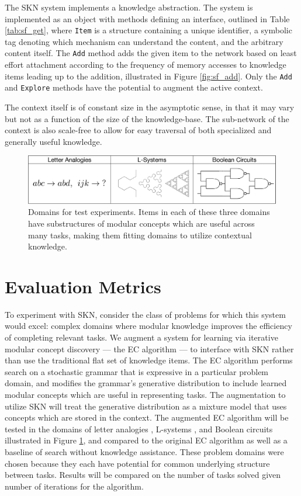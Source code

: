 \documentclass[11pt,letterpaper]{article}
\begin{document}
The SKN system implements a knowledge abstraction. The system is implemented
as an object with methods defining an interface, outlined in Table
\ref{tab:sf_get}, where {\tt Item} is a structure containing a unique
identifier, a symbolic tag denoting which mechanism can understand the
content, and the arbitrary content itself. The {\tt Add} method adds the given
item to the network based on least effort attachment according to the
frequency of memory accesses to knowledge items leading up to the addition,
illustrated in Figure \ref{fig:sf_add}. Only the {\tt Add} and {\tt Explore}
methods have the potential to augment the active context.

The context itself is of constant size in the asymptotic sense, in that it
may vary but not as a function of the size of the knowledge-base. The
sub-network of the context is also scale-free to allow for easy traversal of
both specialized and generally useful knowledge.


\begin{figure}[h]
\centering
\includegraphics[scale=.5]{exps.eps}
\caption{Domains for test experiments. Items in each of these three domains
  have substructures of modular concepts which are useful across many tasks,
  making them fitting domains to utilize contextual knowledge.}
\label{fig:exps}
\end{figure}

\section{Evaluation Metrics}

To experiment with SKN, consider the class of problems for which this system
would excel: complex domains where modular knowledge improves the efficiency
of completing relevant tasks. We augment a system for learning via iterative
modular concept discovery --- the EC algorithm \cite{dechter13} --- to
interface with SKN rather than use the traditional flat set of knowledge
items. The EC algorithm performs search on a stochastic grammar that is
expressive in a particular problem domain, and modifies the grammar's
generative distribution to include learned modular concepts which are useful
in representing tasks. The augmentation to utilize SKN will treat the
generative distribution as a mixture model that uses concepts which are
stored in the context. The augmented EC algorithm will be tested in the
domains of letter analogies \cite{hofstadter94}, L-systems
\cite{rozenberg80}, and Boolean circuits illustrated in Figure
\ref{fig:exps}, and compared to the original EC algorithm as well as a
baseline of search without knowledge assistance. These problem domains were
chosen because they each have potential for common underlying structure
between tasks. Results will be compared on the number of tasks solved given
number of iterations for the algorithm.
\end{document}
